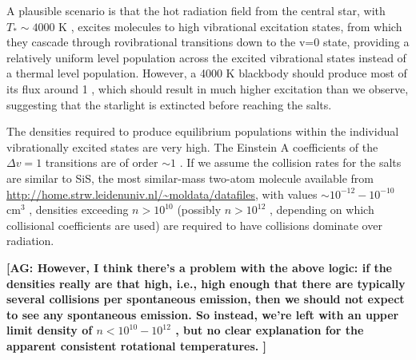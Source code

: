 \documentclass[twocolumn]{aastex62}
\newcommand{\ag}[1]{\textcolor{red!65!black}{\textbf{[AG: #1]}}}
\begin{document}
A plausible scenario is that the hot radiation field from the central star,
with $T_*\sim4000$ K \citep{Testi2010a}, excites molecules to high vibrational
excitation states, from which they cascade through rovibrational transitions
down to the v=0 state, providing a relatively uniform level population
across the excited vibrational states instead of a thermal level population.
However, a 4000 K blackbody should produce most of its flux around 1 \um,
which should result in much higher excitation than we observe, suggesting
that the starlight is extincted before reaching the salts.

The densities required to produce equilibrium populations within the individual
vibrationally excited states are very high.  The Einstein A coefficients of the
$\Delta v=1$ transitions are of order $\sim1$ \pers.  If we assume the
collision rates for the salts are similar to SiS, the most similar-mass
two-atom molecule available from
\url{http://home.strw.leidenuniv.nl/~moldata/datafiles}, with values
$\sim10^{-12}-10^{-10}$ cm$^{3}$ \pers, densities exceeding $n>10^{10}$ \percc
(possibly $n>10^{12}$ \percc, depending on which collisional coefficients are
used) are required to have collisions dominate over radiation. 

\ag{However, I think there's a problem with the above logic: if the densities
really are that high, i.e., high enough that there are typically several collisions
per spontaneous emission, then we should not expect to see any spontaneous emission.
So instead, we're left with an upper limit density of $n<10^{10}-10^{12}$ \percc,
but no clear explanation for the apparent consistent rotational temperatures.
}





%
\end{document}
